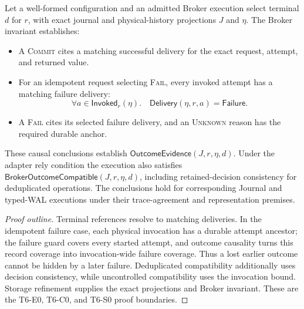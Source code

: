 \documentclass[acmsmall,screen,review,anonymous]{acmart}
\newcommand{\Unknown}{\textsc{Unknown}\xspace}
\newcommand{\Commit}{\textsc{Commit}\xspace}
\newcommand{\Fail}{\textsc{Fail}\xspace}
\begin{document}
\begin{theorem}
\label{thm:terminal-evidence}
Let a well-formed configuration and an admitted Broker execution select
terminal $d$ for $r$, with exact journal and physical-history projections
$J$ and $\eta$. The Broker invariant establishes:
\begin{itemize}
  \item A \Commit cites a matching successful delivery for the exact
    request, attempt, and returned value.
  \item For an idempotent request selecting \Fail, every invoked
    attempt has a matching failure delivery:
    \[
      \forall a\in\mathsf{Invoked}_r(\eta).\quad
      \mathsf{Delivery}(\eta,r,a)=\mathsf{Failure}.
    \]
  \item A \Fail cites its selected failure delivery, and an
    \Unknown reason has the required durable anchor.
\end{itemize}
These causal conclusions establish $\mathsf{OutcomeEvidence}(J,r,\eta,d)$.
Under the adapter rely condition the execution also satisfies
$\mathsf{BrokerOutcomeCompatible}(J,r,\eta,d)$, including
retained-decision consistency for deduplicated operations. The conclusions
hold for corresponding Journal and typed-WAL executions under their
trace-agreement and representation premises.
\end{theorem}
\begin{proof}[Proof outline]
Terminal references resolve to matching deliveries. In the idempotent
failure case, each physical invocation has a durable attempt ancestor;
the failure guard covers every started attempt, and outcome causality
turns this record coverage into invocation-wide failure coverage. Thus
a lost earlier outcome cannot be hidden by a later failure. Deduplicated
compatibility additionally uses decision consistency, while uncontrolled
compatibility uses the invocation bound. Storage refinement supplies
the exact projections and Broker invariant. These are the T6-E0,
T6-C0, and T6-S0 proof boundaries.
\end{proof}
\end{document}
